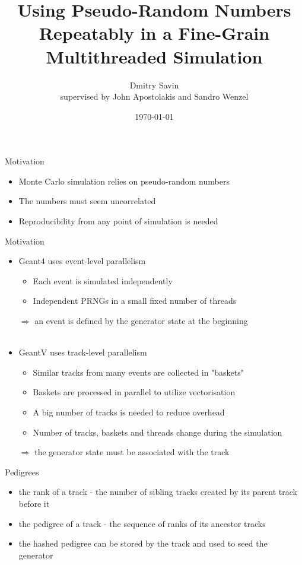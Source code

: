 \documentclass[aspectratio=169, 14pt]{beamer}
\title{Using Pseudo-Random Numbers Repeatably in a Fine-Grain Multithreaded Simulation}
\author{Dmitry Savin\\
supervised by John Apostolakis and Sandro Wenzel}
\date{\today}
\begin{document}
\begin{large}

 \frame{\titlepage}


 \begin{frame}{Motivation}
 \large
  \begin{itemize}
   \item Monte Carlo simulation relies on pseudo-random numbers
   \item The numbers must seem uncorrelated
   \item Reproducibility from any point of simulation is needed
  \end{itemize}
 \end{frame}
 
  \begin{frame}{Motivation}
  \large
  \begin{itemize}
   \item Geant4 uses event-level parallelism
   \begin{itemize}
     \item Each event is simulated independently
     \item Independent PRNGs in a small fixed number of threads
    \end{itemize}
    $\Rightarrow$ an event is defined by the generator state at the beginning\\ \ \\
   \item GeantV uses track-level parallelism
    \begin{itemize}
     \item Similar tracks from many events are collected in "baskets"
     \item Baskets are processed in parallel to utilize vectorisation
     \item A big number of tracks is needed to reduce overhead
     \item Number of tracks, baskets and threads change during the simulation
    \end{itemize}
   $\Rightarrow$ the generator state must be associated with the track
  \end{itemize}

 \end{frame}

 
 \begin{frame}{Pedigrees}
  \begin{itemize}
   \item the rank of a track - the number of sibling tracks created by its parent track before it
   \item the pedigree of a track - the sequence of ranks of its ancestor tracks
   \item the hashed pedigree can be stored by the track and used to seed the generator
  \end{itemize}
 \end{frame}



\end{large}
\end{document}
